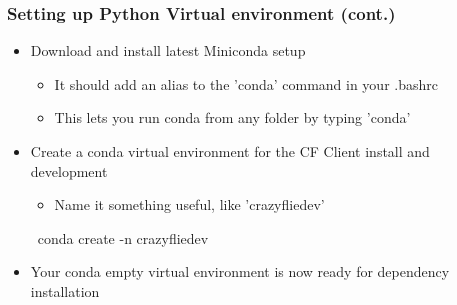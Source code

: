 \documentclass[t, xcolor=dvipsnames]{beamer} %
\begin{document}
\begin{frame}
	\frametitle{Setting up Python Virtual environment (cont.)}
	\begin{itemize}
		\item Download and install latest Miniconda setup
		\begin{itemize}
			\item It should add an alias to the 'conda' command in your .bashrc
			\item This lets you run conda from any folder by typing 'conda'
		\end{itemize}			
		\item Create a conda virtual environment for the CF Client install and development
		\begin{itemize}
			\item Name it something useful, like 'crazyfliedev'
		\end{itemize}
			\begin{semiverbatim}
			\ conda create -n crazyfliedev
			\end{semiverbatim}
		\item Your conda empty virtual environment is now ready for dependency installation
	\end{itemize}
\end{frame}
\end{document}
